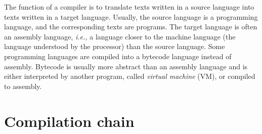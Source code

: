 The function of a compiler is to translate texts written in a source
language into texts written in a target language. Usually, the source
language is a programming language, and the corresponding texts are
programs. The target language is often an assembly
language, \emph{i.e.,} a language closer to the machine language (the
language understood by the processor) than the source language. Some
programming languages are compiled into a bytecode language instead of
assembly. Bytecode is usually more abstract than an assembly language
and is either interpreted by another program, called
\emph{virtual machine} (VM), or compiled to assembly.

\section*{Compilation chain}

